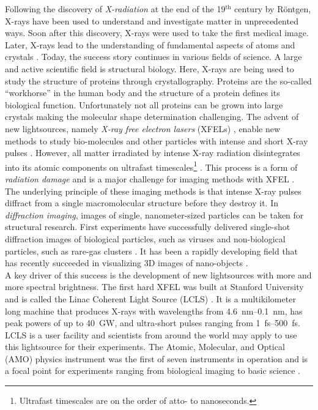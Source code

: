 Following the discovery of \textit{X-radiation} at the end of the 19$^{\text{th}}$ century by R\"ontgen, X-rays have been used to understand and investigate matter in unprecedented ways. Soon after this discovery, X-rays were used to take the first medical image. Later, X-rays lead to the understanding of fundamental aspects of atoms \citep{Siegbahn-NP} and crystals \citep{Laue-NP,Bragg-NP}. Today, the success story continues in various fields of science. A large and active scientific field is structural biology. Here, X-rays are being used to study the structure of proteins through crystallography. Proteins are the so-called ``workhorse'' in the human body and the structure of a protein defines its biological function. Unfortunately not all proteins can be grown into large crystals making the molecular shape determination challenging. The advent of new lightsources, namely \textit{X-ray free electron lasers} (XFELs) \citep{Ackermann-2007-NPho}, enable new methods to study bio-molecules and other particles with intense and short X-ray pulses \citep{Chapman-2006-NatPhys,Chapman-2011-Nature}. However, all matter irradiated by intense X-ray radiation disintegrates into its atomic components on ultrafast timescales\footnote{Ultrafast timescales are on the order of atto- to nanoseconds.} \citep{Neutze-2000-Nature}. This process is a form of \textit{radiation damage} and is a major challenge for imaging methods with XFEL \citep{Aquila-2015-StrucDyn}.\\[1\baselineskip]
%
The underlying principle of these imaging methods is that intense X-ray pulses diffract from a single macromolecular structure before they destroy it. In \textit{diffraction imaging}, images of single, nanometer-sized particles can be taken for structural research. First experiments have successfully delivered single-shot diffraction images of biological particles, such as viruses \citep{Seibert-2011-Nature} and non-biological particles, such as rare-gas clusters \citep{Gomez-2014-Science}. It has been a rapidly developing field that has recently succeeded in visualizing 3D images of nano-objects \citep{Ekeberg-2015-PRL,Barke-2015-NatComm}.\\[1\baselineskip]
%
A key driver of this success is the development of new lightsources with more and more spectral brightness. The first hard XFEL was built at Stanford University and is called the Linac Coherent Light Source (LCLS) \citep{Emma-2010-NatPho}. It is a multikilometer long machine that produces X-rays with wavelengths from \SIrange{4.6}{0.1}{\nano\meter}, has peak powers of up to \SI{40}{\giga\watt}, and ultra-short pulses ranging from \SIrange{1}{500}{\femto\second}. LCLS is a user facility and scientists from around the world may apply to use this lightsource for their experiments. The Atomic, Molecular, and Optical (AMO) physics instrument was the first of seven instruments in operation and is a focal point for experiments ranging from biological imaging to basic science \citep{Bostedt-2016-RMP}.\\[1\baselineskip]
